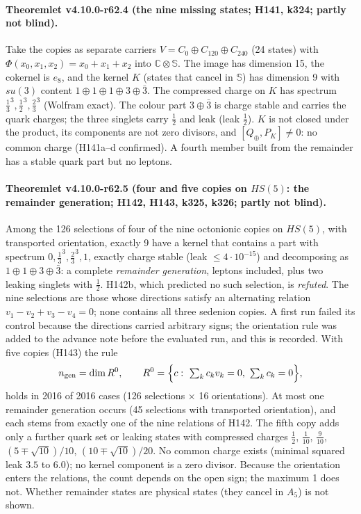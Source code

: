 \paragraph{Theoremlet v4.10.0-r62.4 (the nine missing states; H141, k324; partly not blind).}
Take the copies as separate carriers \(V=C_0\oplus C_{120}\oplus C_{240}\) (24 states) with \(\Phi(x_0,x_1,x_2)=x_0+x_1+x_2\) into
\(\mathbb C\otimes\mathbb S\).  The image has dimension 15, the cokernel is \(e_8\), and the kernel \(K\) (states that cancel in \(\mathbb S\)) has
dimension 9 with \(su(3)\) content \(1\oplus1\oplus1\oplus3\oplus\bar3\).  The compressed charge on \(K\) has spectrum
\(\tfrac13^3,\tfrac12^3,\tfrac23^3\) (Wolfram exact).  The colour part \(3\oplus\bar3\) is charge stable and carries the quark charges; the three
singlets carry \(\tfrac12\) and leak (leak \(\tfrac12\)).  \(K\) is not closed under the product, its components are not zero divisors, and
\([Q_\oplus,P_K]\ne0\): no common charge (H141a--d confirmed).  A fourth member built from the remainder has a stable quark part but no leptons.

\paragraph{Theoremlet v4.10.0-r62.5 (four and five copies on \(HS(5)\): the remainder generation; H142, H143, k325, k326; partly not blind).}
Among the 126 selections of four of the nine octonionic copies on \(HS(5)\), with transported orientation, exactly 9 have a kernel that
contains a part with spectrum \(0,\tfrac13^3,\tfrac23^3,1\), exactly charge stable (leak \(\le4\cdot10^{-15}\)) and decomposing as
\(1\oplus1\oplus3\oplus\bar3\): a complete \emph{remainder generation}, leptons included, plus two leaking singlets with \(\tfrac12\).  H142b, which
predicted no such selection, is \emph{refuted}.  The nine selections are those whose directions satisfy an alternating relation
\(v_1-v_2+v_3-v_4=0\); none contains all three sedenion copies.  A first run failed its control because the directions carried arbitrary signs;
the orientation rule was added to the advance note before the evaluated run, and this is recorded.  With five copies (H143) the rule
\[
n_{\rm gen}=\dim R^0,\qquad R^0=\Bigl\{c:\ \textstyle\sum_k c_kv_k=0,\ \sum_k c_k=0\Bigr\},
\]
holds in 2016 of 2016 cases (126 selections \(\times\) 16 orientations).  At most one remainder generation occurs (45 selections with transported
orientation), and each stems from exactly one of the nine relations of H142.  The fifth copy adds only a further quark set or leaking states with
compressed charges \(\tfrac12\), \(\tfrac1{10}\), \(\tfrac9{10}\), \((5\mp\sqrt{10})/10\), \((10\mp\sqrt{10})/20\).  No common charge exists
(minimal squared leak \(3.5\) to \(6.0\)); no kernel component is a zero divisor.  Because the orientation enters the relations, the count depends
on the open sign; the maximum 1 does not.  Whether remainder states are physical states (they cancel in \(A_5\)) is not shown.

